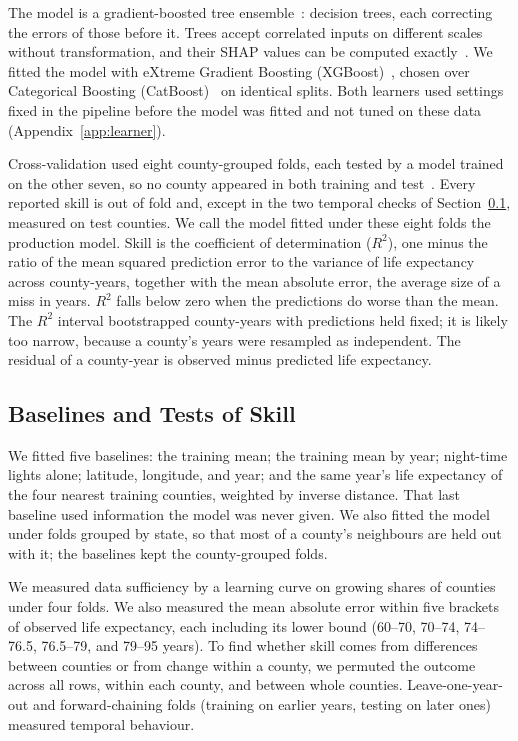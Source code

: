 \documentclass[sensors,article,submit,moreauthors,pdftex]{Definitions/mdpi}
\begin{document}
The model is a gradient-boosted tree ensemble~\cite{Friedman2001}:
\RefitTrees{} decision trees, each correcting the errors of those before it.
Trees accept correlated
inputs on different scales without transformation, and their SHAP values can be
computed exactly~\cite{Lundberg2020}. We fitted the model with
eXtreme Gradient Boosting (XGBoost)~\cite{Chen2016}, chosen over Categorical
Boosting (CatBoost)~\cite{Prokhorenkova2018} on identical splits. Both learners
used settings fixed in the pipeline before the model was fitted and not tuned
on these data (Appendix~\ref{app:learner}).

Cross-validation used eight county-grouped folds, each tested by a model trained on the other
seven, so no county appeared
in both training and test~\cite{Roberts2017}. Every reported skill is out of
fold and, except in the two temporal checks of Section~\ref{ssec:m_validation},
measured on test counties. We call the model fitted under these
eight folds the production model. Skill is the coefficient of
determination ($R^{2}$), one minus the ratio of the mean squared prediction error to the variance of life expectancy across
county-years, together with the mean absolute
error, the average size of a miss in years. $R^{2}$ falls below zero when the predictions do worse than the mean. The $R^{2}$ interval bootstrapped
county-years with predictions held fixed; it is likely too narrow, because a county's years were resampled as independent. The residual of a county-year is
observed minus predicted life expectancy.

\subsection{Baselines and Tests of Skill}
\label{ssec:m_validation}
We fitted five baselines: the training mean; the
training mean by year; night-time lights alone; latitude, longitude, and year;
and the same year's life expectancy of the four nearest training counties,
weighted by inverse distance. That last baseline used
information the model was never given. We also fitted the model under folds
grouped by state, so that most of a county's neighbours are held out with it;
the baselines kept the county-grouped folds.

We measured data sufficiency by a learning curve on growing shares of counties
under four folds. We also measured the mean absolute error within five brackets of
observed life expectancy, each including its lower bound (60--70, 70--74, 74--76.5, 76.5--79, and 79--95 years). To find whether skill comes from differences between
counties or from change within a county, we permuted the outcome across all
rows, within each county, and between whole counties.
Leave-one-year-out and forward-chaining folds (training on earlier years, testing on later ones) measured temporal behaviour.
\end{document}
